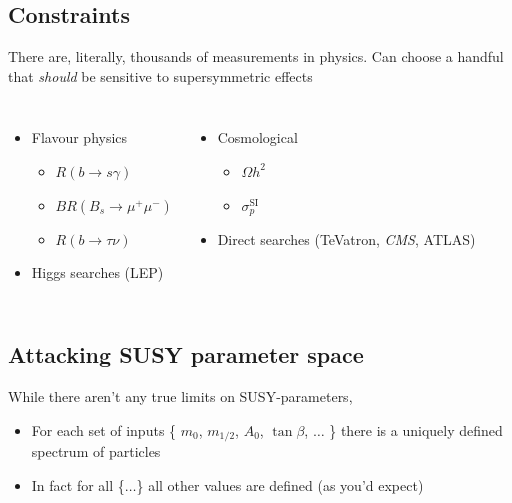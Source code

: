 \documentclass{beamer}
\newcommand{\Rbsg}{R(b\rightarrow s\gamma)}
\newcommand{\Rbtn}{R(b\rightarrow \tau\nu)}
\newcommand{\BRbsmumu}{BR(B_{s}\rightarrow\mu^{+}\mu^{-})}
\newcommand{\Ohsq}{\Omega h^{2}}
\newcommand{\Spsi}{\sigma_{p}^{\textrm{SI}}}
\begin{document}
\subsection{Constraints}
\begin{frame}{\insertsubsection}
There are, literally, thousands of measurements in physics.  Can choose a
handful that \emph{should} be sensitive to supersymmetric effects
\begin{columns}[c]
    \begin{itemize}
        \item  Flavour physics
        \begin{itemize} 
            \item $\Rbsg$
            \item $\BRbsmumu$
            \item $\Rbtn$
        \end{itemize}
        \item Higgs searches (LEP)
    \end{itemize}
    \begin{itemize}
        \item Cosmological
        \begin{itemize}
            \item $\Ohsq$
            \item $\Spsi$
        \end{itemize}
        \item Direct searches (TeVatron, \emph{CMS}, ATLAS)
    \end{itemize}
\end{columns}
\end{frame}

\subsection{Attacking SUSY parameter space}
\begin{frame}{\insertsubsection}
While there aren't any true limits on SUSY-parameters,
\begin{itemize}
    \item For each set of inputs \{ $m_{0}$, $m_{1/2}$, $A_{0}$, $\tan\beta$,
    $\hdots$ \} there is a uniquely defined spectrum of particles
    \item In fact for all \{$\hdots$\} all other values are defined (as you'd expect)
\end{itemize}
\end{frame}
\end{document}
